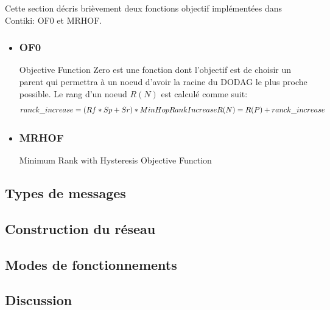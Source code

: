 Cette section décris brièvement deux fonctions objectif implémentées dans Contiki: OF0 et MRHOF.
\begin{itemize}
    \item \subsubsection*{OF0}%
            Objective Function Zero est une fonction dont l'objectif est de choisir un parent qui permettra à un noeud d'avoir la racine du DODAG le plus proche possible. Le rang d'un noeud $R(N)$ est calculé comme suit:
            \begin{equation}
                ranck\_increase = (Rf * Sp + Sr) * MinHopRankIncrease
                \newline
                R(N) = R(P) + ranck\_increase
            \end{equation}
    \item \subsubsection*{MRHOF}
            Minimum Rank with Hysteresis Objective Function
\end{itemize}




\subsection*{Types de messages}

\subsection*{Construction du réseau}

\subsection*{Modes de fonctionnements}

\subsection*{Discussion}
